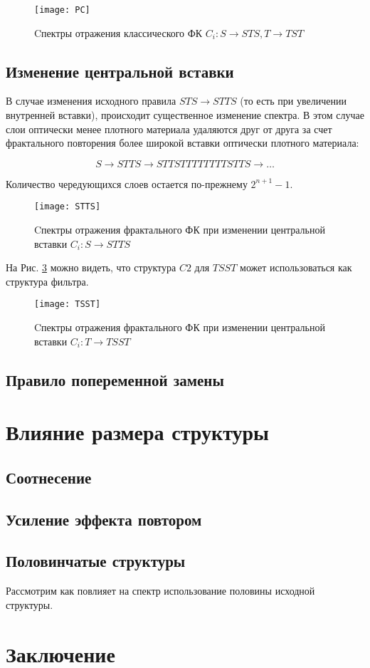 \documentclass[a4paper, 12pt, oneside]{article}
\begin{document}
\begin{figure}[h!]
	\centering
	\texttt{[image: PC]}
	\caption{Cпектры отражения классического ФК $C_i: S \rightarrow STS, T \rightarrow TST$}
	\label{fig:spectraPC}
\end{figure}

\subsection{Изменение центральной вставки}

В случае изменения исходного правила $STS \rightarrow STTS$ (то есть при увеличении внутренней вставки), происходит существенное изменение спектра. В этом случае слои оптически менее плотного материала удаляются друг от друга за счет фрактального повторения более широкой вставки оптически плотного материала:

$$S \rightarrow STTS \rightarrow STTSTTTTTTTTSTTS \rightarrow \dots$$

Количество чередующихся слоев остается по-прежнему $2^{n+1}-1$.

\begin{figure}[h!]
	\centering
	\texttt{[image: STTS]}
	\caption{Cпектры отражения фрактального ФК при изменении центральной вставки $C_i: S \rightarrow STTS$}
	\label{fig:spectraSTTS}
\end{figure}

На Рис. \ref{fig:spectraTSST} можно видеть, что структура $C2$ для $TSST$ может использоваться как структура фильтра.

\begin{figure}[h!]
	\centering
	\texttt{[image: TSST]}
	\caption{Cпектры отражения фрактального ФК при изменении центральной вставки $C_i: T \rightarrow TSST$}
	\label{fig:spectraTSST}
\end{figure}

\subsection{Правило попеременной замены}

\section{Влияние размера структуры}

\subsection{Соотнесение}

\subsection{Усиление эффекта повтором}

\subsection{Половинчатые структуры}

Рассмотрим как повлияет на спектр использование половины исходной структуры.

\section{Заключение}
	
\end{document}
